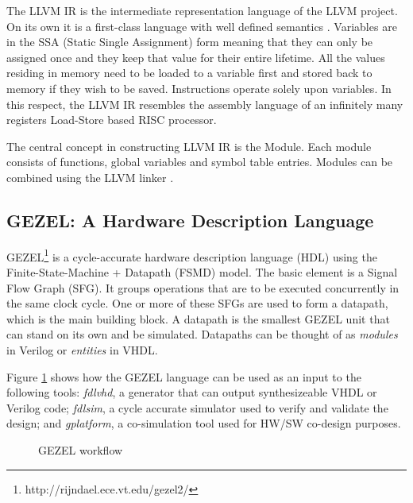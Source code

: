 The LLVM IR is the intermediate representation language of the LLVM
project. On its own it is a first-class language with well defined
semantics \cite{llvm_general,llvmmasterthesis}. Variables are in the SSA (Static Single
Assignment) form meaning that they can only be assigned once and they
keep that value for their entire lifetime. All the values residing in
memory need to be loaded to a variable first and stored back to memory
if they wish to be saved. Instructions operate solely upon
variables. In this respect, the LLVM IR resembles the assembly
language of an infinitely many registers Load-Store based RISC
processor.

The central concept in constructing LLVM IR is the Module. Each module
consists of functions, global variables and symbol table entries.
Modules can be combined using the LLVM linker \cite{llvm_ir}.

\subsection{GEZEL: A Hardware Description Language}
\label{gezel}

GEZEL\footnote{http://rijndael.ece.vt.edu/gezel2/} is a cycle-accurate hardware description language (HDL) using the
Finite-State-Machine + Datapath (FSMD) model. The basic element is a Signal Flow Graph (SFG). It groups operations that
are to be executed concurrently in the same clock cycle. One or more of these SFGs are used to form a datapath, which is the
main building block. A datapath is the smallest GEZEL unit that can stand on
its own and be simulated. Datapaths can be thought of as
\emph{modules} in Verilog or \emph{entities} in VHDL.

Figure \ref{fig:gezel_workflow} shows how the GEZEL language
can be used as an input to the following tools: \emph{fdlvhd}, a generator that can output synthesizeable VHDL or Verilog code; \emph{fdlsim}, a cycle accurate simulator used to verify and validate the design; and \emph{gplatform}, a co-simulation tool used for HW/SW co-design purposes.

\begin{figure}[hb!]
  \centering
  \caption{GEZEL workflow}
  \label{fig:gezel_workflow}
\end{figure}

